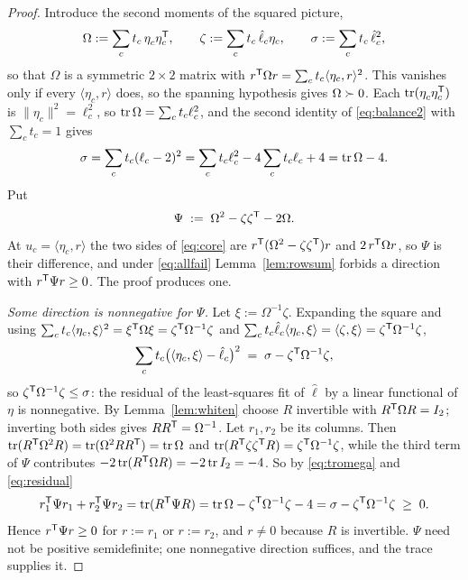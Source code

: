 \begin{proof}
Introduce the second moments of the squared picture,
\[
  \Omega:=\sum_c t_c\,\eta_c^{\vphantom{\mathsf{T}}}\eta_c\tp,
  \qquad
  \zeta:=\sum_c t_c\,\hat\ell_c\eta_c,
  \qquad
  \sigma:=\sum_c t_c\,\hat\ell_c^2 ,
\]
so that $\Omega$ is a symmetric $2\times2$ matrix with $r^{\mathsf{T}}\Omega
r=\sum_ct_c\langle \eta_c,r\rangle^2$.  This vanishes only if every $\langle
\eta_c,r\rangle$ does, so the spanning hypothesis gives $\Omega\succ0$.  Each
$\tr(\eta_c^{\vphantom{\mathsf{T}}}\eta_c\tp)$ is $\lVert
\eta_c\rVert^2=\ell_c^2$, so $\operatorname{tr}\Omega=\sum_ct_c\ell_c^2$, and the second
identity of \eqref{eq:balance2} with $\sum_ct_c=1$ gives
\begin{equation}\label{eq:tromega}
  \sigma=\sum_c t_c(\ell_c-2)^2=\sum_c t_c\ell_c^2-4\sum_ct_c\ell_c+4
        =\operatorname{tr}\Omega-4 .
\end{equation}
Put
\[
  \Psi\;:=\;\Omega^2-\zeta\zeta^{\mathsf{T}}-2\Omega .
\]
At $u_c=\langle \eta_c,r\rangle$ the two sides of \eqref{eq:core} are
$r^{\mathsf{T}}(\Omega^2-\zeta\zeta^{\mathsf{T}})r$ and $2\,r^{\mathsf{T}}\Omega r$, so $\Psi$ is their
difference, and under \eqref{eq:allfail} Lemma~\ref{lem:rowsum} forbids a
direction with $r^{\mathsf{T}}\Psi r\ge0$.  The proof produces one.

\emph{Some direction is nonnegative for $\Psi$.}  Let $\xi:=\Omega^{-1}
\zeta$.  Expanding the square and using
$\sum_ct_c\langle \eta_c,\xi\rangle^2=\xi^{\mathsf{T}}\Omega\xi=\zeta^{\mathsf{T}}
\Omega^{-1}\zeta$ and $\sum_ct_c\hat\ell_c\langle \eta_c,\xi\rangle=\langle
\zeta,\xi\rangle=\zeta^{\mathsf{T}}\Omega^{-1}\zeta$,
\begin{equation}\label{eq:residual}
  \sum_c t_c\bigl(\langle \eta_c,\xi\rangle-\hat\ell_c\bigr)^2
  \;=\;\sigma-\zeta^{\mathsf{T}}\Omega^{-1}\zeta ,
\end{equation}
so $\zeta^{\mathsf{T}}\Omega^{-1}\zeta\le\sigma$: the residual of the least-squares
fit of $\hat\ell$ by a linear functional of $\eta$ is nonnegative.  By
Lemma~\ref{lem:whiten} choose $R$ invertible with $R^{\mathsf{T}}\Omega R=I_2$;
inverting both sides gives
$RR^{\mathsf{T}}=\Omega^{-1}$.  Let $r_1,r_2$ be its columns.  Then $\operatorname{tr}(R^{\mathsf{T}}\Omega^2R)
=\operatorname{tr}(\Omega^2RR^{\mathsf{T}})=\operatorname{tr}\Omega$ and $\operatorname{tr}(R^{\mathsf{T}}\zeta\zeta^{\mathsf{T}} R)
=\zeta^{\mathsf{T}}\Omega^{-1}\zeta$, while the third term of $\Psi$ contributes
$-2\operatorname{tr}(R^{\mathsf{T}}\Omega R)=-2\operatorname{tr} I_2=-4$.  So by \eqref{eq:tromega} and
\eqref{eq:residual}
\[
  r_1^{\mathsf{T}}\Psi r_1+r_2^{\mathsf{T}}\Psi r_2
  =\operatorname{tr}(R^{\mathsf{T}}\Psi R)
  =\operatorname{tr}\Omega-\zeta^{\mathsf{T}}\Omega^{-1}\zeta-4
  =\sigma-\zeta^{\mathsf{T}}\Omega^{-1}\zeta
  \;\ge\;0 .
\]
Hence $r^{\mathsf{T}}\Psi r\ge0$ for $r:=r_1$ or $r:=r_2$, and $r\ne0$ because $R$
is invertible.  $\Psi$ need not be positive semidefinite; one nonnegative
direction suffices, and the trace supplies it.


\end{proof}
